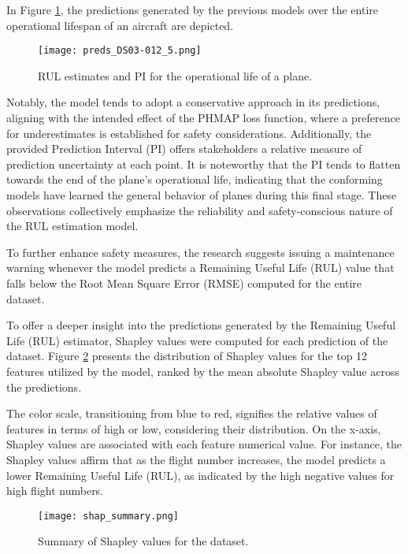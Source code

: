 \documentclass{IEEEtran}
\begin{document}
            In Figure \ref{fig:sample_estimates_pi}, the predictions generated by the previous models over the entire operational lifespan of an aircraft are depicted.
            \begin{figure}[!htbp]
                \centering
                \texttt{[image: preds\_DS03-012\_5.png]}
                \caption{RUL estimates and PI for the operational life of a plane.}
                \label{fig:sample_estimates_pi}
            \end{figure}

            Notably, the model tends to adopt a conservative approach in its predictions, aligning with the intended effect of the PHMAP loss function, where a preference for underestimates is established for safety considerations. Additionally, the provided Prediction Interval (PI) offers stakeholders a relative measure of prediction uncertainty at each point. It is noteworthy that the PI tends to flatten towards the end of the plane's operational life, indicating that the conforming models have learned the general behavior of planes during this final stage. These observations collectively emphasize the reliability and safety-conscious nature of the RUL estimation model.

            To further enhance safety measures, the research suggests issuing a maintenance warning whenever the model predicts a Remaining Useful Life (RUL) value that falls below the Root Mean Square Error (RMSE) computed for the entire dataset.

            To offer a deeper insight into the predictions generated by the Remaining Useful Life (RUL) estimator, Shapley values were computed for each prediction of the dataset. Figure \ref{fig:shap_summary} presents the distribution of Shapley values for the top 12 features utilized by the model, ranked by the mean absolute Shapley value across the predictions.

            The color scale, transitioning from blue to red, signifies the relative values of features in terms of high or low, considering their distribution. On the x-axis, Shapley values are associated with each feature numerical value. For instance, the Shapley values affirm that as the flight number increases, the model predicts a lower Remaining Useful Life (RUL), as indicated by the high negative values for high flight numbers.
            \begin{figure}[H]
                \centering
                \texttt{[image: shap\_summary.png]}
                \caption{Summary of Shapley values for the dataset.}
                \label{fig:shap_summary}
            \end{figure}
\end{document}
